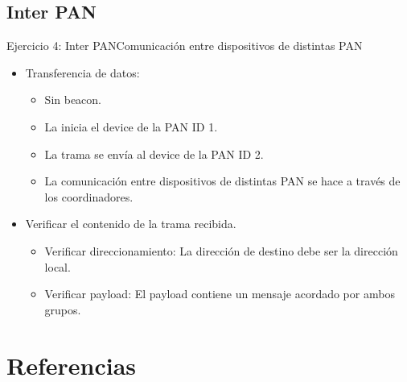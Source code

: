 \documentclass[aspectratio=169, handout]{beamer}
\begin{document}
\subsection[Inter PAN]{Inter PAN}
\begin{frame}[t]{Ejercicio 4: Inter PAN}{Comunicación entre dispositivos de distintas PAN}
    \begin{itemize}
        \item Transferencia de datos:
            \begin{itemize}
            \item Sin beacon.
            \vspace{5px}
            \item La inicia el device de la PAN ID 1.
            \vspace{5px}   
            \item La trama se envía al device de la PAN ID 2.
            \vspace{5px}
            \item La comunicación entre dispositivos de distintas PAN se hace a través de los coordinadores.
            \vspace{5px}
            \end{itemize}
        \item Verificar el contenido de la trama recibida.
        \vspace{5px}
            \begin{itemize}
            \item Verificar direccionamiento: La dirección de destino debe ser la dirección local.
            \vspace{5px}
            \item Verificar payload: El payload contiene un mensaje acordado por ambos grupos.
            \vspace{5px}
            \end{itemize}
        \vspace{5px}
    \end{itemize}   
\end{frame}

\section{Referencias}
\end{document}
